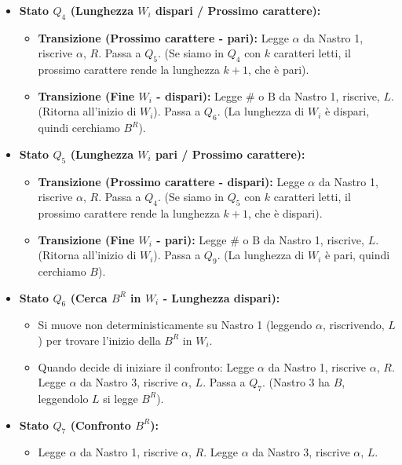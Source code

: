 \documentclass[a4paper]{article}
\newcommand{\B}{\text{B}} %
\begin{document}
\begin{itemize}
    \item \textbf{Stato $Q_4$ (Lunghezza $W_i$ dispari / Prossimo carattere):}
        \begin{itemize}
            \item \textbf{Transizione (Prossimo carattere - pari):}
                Legge $\alpha$ da Nastro 1, riscrive $\alpha$, $R$. Passa a $Q_5$.
                (Se siamo in $Q_4$ con $k$ caratteri letti, il prossimo carattere rende la lunghezza $k+1$, che è pari).
            \item \textbf{Transizione (Fine $W_i$ - dispari):}
                Legge $\#$ o $\B$ da Nastro 1, riscrive, $L$. (Ritorna all'inizio di $W_i$).
                Passa a $Q_6$. (La lunghezza di $W_i$ è dispari, quindi cerchiamo $B^R$).
        \end{itemize}
    \item \textbf{Stato $Q_5$ (Lunghezza $W_i$ pari / Prossimo carattere):}
        \begin{itemize}
            \item \textbf{Transizione (Prossimo carattere - dispari):}
                Legge $\alpha$ da Nastro 1, riscrive $\alpha$, $R$. Passa a $Q_4$.
                (Se siamo in $Q_5$ con $k$ caratteri letti, il prossimo carattere rende la lunghezza $k+1$, che è dispari).
            \item \textbf{Transizione (Fine $W_i$ - pari):}
                Legge $\#$ o $\B$ da Nastro 1, riscrive, $L$. (Ritorna all'inizio di $W_i$).
                Passa a $Q_9$. (La lunghezza di $W_i$ è pari, quindi cerchiamo $B$).
        \end{itemize}
    \item \textbf{Stato $Q_6$ (Cerca $B^R$ in $W_i$ - Lunghezza dispari):}
        \begin{itemize}
            \item Si muove non deterministicamente su Nastro 1 (leggendo $\alpha$, riscrivendo, $L$) per trovare l'inizio della $B^R$ in $W_i$.
            \item Quando decide di iniziare il confronto: Legge $\alpha$ da Nastro 1, riscrive $\alpha$, $R$. Legge $\alpha$ da Nastro 3, riscrive $\alpha$, $L$. Passa a $Q_7$.
            (Nastro 3 ha $B$, leggendolo $L$ si legge $B^R$).
        \end{itemize}
    \item \textbf{Stato $Q_7$ (Confronto $B^R$):}
        \begin{itemize}
            \item Legge $\alpha$ da Nastro 1, riscrive $\alpha$, $R$. Legge $\alpha$ da Nastro 3, riscrive $\alpha$, $L$.

\end{itemize}
\end{itemize}
\end{document}

